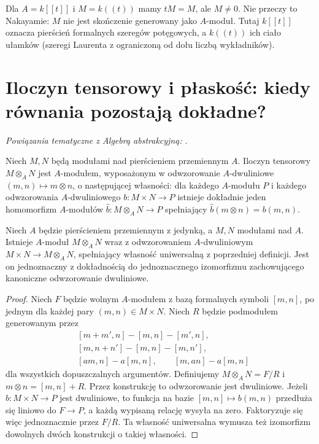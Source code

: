 \begin{uwaga}
Dla $A=k[[t]]$ i $M=k((t))$ mamy $tM=M$,
ale $M\ne0$. Nie przeczy to Nakayamie: $M$
nie jest skończenie generowany jako $A$-moduł.
Tutaj $k[[t]]$ oznacza pierścień formalnych
szeregów potęgowych, a $k((t))$ ich ciało ułamków
(szeregi Laurenta z ograniczoną od dołu liczbą wykładników).
\end{uwaga}

\section{Iloczyn tensorowy i płaskość: kiedy równania pozostają dokładne?}
\label{sec:flatness}

\noindent\emph{Powiązania tematyczne z Algebrą abstrakcyjną:} .


\begin{definicja}
Niech $M,N$ będą modułami nad pierścieniem przemiennym $A$.
Iloczyn tensorowy $M\otimes_A N$ jest $A$-modułem,
wyposażonym w odwzorowanie $A$-dwuliniowe
$(m,n)\mapsto m\otimes n$, o następującej własności:
dla każdego $A$-modułu $P$ i każdego odwzorowania
$A$-dwuliniowego $b:M\times N\to P$ istnieje dokładnie
jeden homomorfizm $A$-modułów
$\widehat b:M\otimes_A N\to P$ spełniający
$\widehat b(m\otimes n)=b(m,n)$.
\end{definicja}

\begin{stwierdzenie}
Niech $A$ będzie pierścieniem przemiennym z jedynką, a $M,N$
modułami nad $A$. Istnieje $A$-moduł $M\otimes_A N$
wraz z odwzorowaniem $A$-dwuliniowym
$M\times N\to M\otimes_A N$, spełniający własność
uniwersalną z poprzedniej definicji. Jest on jednoznaczny
z dokładnością do jednoznacznego izomorfizmu zachowującego
kanoniczne odwzorowanie dwuliniowe.
\end{stwierdzenie}
\begin{proof}
Niech $F$ będzie wolnym $A$-modułem z bazą
formalnych symboli $[m,n]$, po jednym dla każdej
pary $(m,n)\in M\times N$. Niech $R$ będzie
podmodułem generowanym przez
\[
\begin{aligned}
 &[m+m',n]-[m,n]-[m',n],\\
 &[m,n+n']-[m,n]-[m,n'],\\
 &[am,n]-a[m,n],\qquad [m,an]-a[m,n]
\end{aligned}
\]
dla wszystkich dopuszczalnych argumentów.
Definiujemy $M\otimes_A N=F/R$ i
$m\otimes n=[m,n]+R$. Przez konstrukcję
to odwzorowanie jest dwuliniowe.
Jeżeli $b:M\times N\to P$ jest dwuliniowe,
to funkcja na bazie $[m,n]\mapsto b(m,n)$
przedłuża się liniowo do $F\to P$, a każdą
wypisaną relację wysyła na zero.
Faktoryzuje się więc jednoznacznie przez $F/R$.
Ta własność uniwersalna wymusza też izomorfizm
dowolnych dwóch konstrukcji o takiej własności.
\end{proof}

